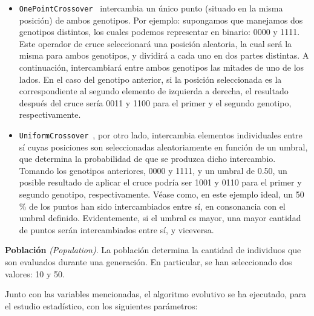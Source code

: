 \begin{itemize}
    \item \texttt{OnePointCrossover}~\cite{eiben_422_2003} intercambia un único punto (situado en la misma posición) de ambos genotipos. Por ejemplo: supongamos que manejamos dos genotipos distintos, los cuales podemos representar en binario: 0000 y 1111. Este operador de cruce seleccionará una posición aleatoria, la cual será la misma para ambos genotipos, y dividirá a cada uno en dos partes distintas. A continuación, intercambiará entre ambos genotipos las mitades de uno de los lados. En el caso del genotipo anterior, si la posición seleccionada es la correspondiente al segundo elemento de izquierda a derecha, el resultado después del cruce sería 0011 y 1100 para el primer y el segundo genotipo, respectivamente.
    \item \texttt{UniformCrossover}~\cite{eiben_422_2003}, por otro lado, intercambia elementos individuales entre sí cuyas posiciones son seleccionadas aleatoriamente en función de un umbral, que determina la probabilidad de que se produzca dicho intercambio. Tomando los genotipos anteriores, 0000 y 1111, y un umbral de 0.50, un posible resultado de aplicar el cruce podría ser 1001 y 0110 para el primer y segundo genotipo, respectivamente. Véase como, en este ejemplo ideal, un 50 \% de los puntos han sido intercambiados entre sí, en consonancia con el umbral definido. Evidentemente, si el umbral es mayor, una mayor cantidad de puntos serán intercambiados entre sí, y viceversa.
\end{itemize}

\textbf{Población} \textit{(Population)}. La población determina la cantidad de individuos que son evaluados durante una generación. En particular, se han seleccionado dos valores: 10 y 50.

Junto con las variables mencionadas, el algoritmo evolutivo se ha ejecutado, para el estudio estadístico, con los siguientes parámetros:

